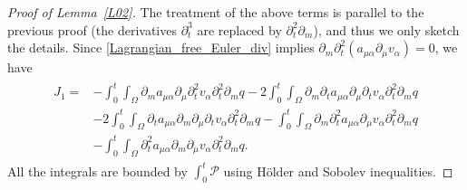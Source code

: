 \documentclass[10pt,reqno]{amsart}
\theoremstyle{plain}
\theoremstyle{definition}
\numberwithin{equation}{section}
\newcommand{\ccP}{\mathscr{P}}
\newcommand{\al}{\alpha}
\newcommand{\Om}{\Omega}
\newcommand{\norm}[1]{\Vert#1\Vert}
\def\gdot{{\color{green}{\hskip-.0truecm\rule[-1mm]{4mm}{4mm}\hskip.2truecm}}\hskip-.3truecm}
\begin{document}
\begin{proof}[Proof of Lemma~\ref{L02}]
The treatment of the above terms is parallel to the previous proof 
(the derivatives $\partial_{t}^{3}$ are replaced by
$\partial_{t}^2\partial_{m}$), and thus we only sketch the details.
Since \eqref{Lagrangian_free_Euler_div} implies $\partial_m
\partial^2_t (a_{\mu\al} \partial_\mu v_\al) = 0$, we have
\begin{align}
\begin{split}
J_ 1=& 
- \int_0^t \int_\Om \partial_m a_{\mu \al} \partial_\mu \partial^2_t v_\al 
\partial^2_t \partial_m q
- 2 \int_0^t \int_\Om \partial_m \partial_t  a_{\mu \al} \partial_\mu \partial_t v_\al 
\partial^2_t \partial_m q
\\
&
- 2 \int_0^t \int_\Om \partial_t a_{\mu \al}  \partial_m  \partial_\mu \partial_t v_\al 
\partial^2_t \partial_m q
- \int_0^t \int_\Om \partial_m \partial^2_t a_{\mu \al} \partial_\mu v_\al 
\partial^2_t \partial_m q
\\
&
- \int_0^t \int_\Om  \partial^2_t a_{\mu \al} \partial_m \partial_\mu v_\al 
\partial^2_t \partial_m q
   .
\end{split}
\nonumber
\end{align}
All the integrals are bounded 
by $\int_{0}^{t}\ccP$
using 
H\"older and Sobolev inequalities.

\end{proof}
\end{document}
